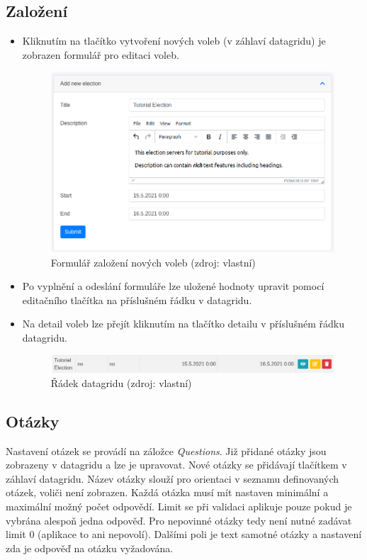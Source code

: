 \subsection*{Založení}
\begin{itemize}
	\item Kliknutím na tlačítko vytvoření nových voleb (v záhlaví datagridu) je zobrazen formulář pro editaci voleb.
	\begin{figure}[h]
	\centering
	\includegraphics[width=\linewidth]{tex/attachements/noveVolbyForm.png}
	\captionsetup{width=\linewidth}
	\caption[Formulář založení nových voleb]{Formulář založení nových voleb (zdroj: vlastní)}
\end{figure}
	\item Po vyplnění a odeslání formuláře lze uložené hodnoty upravit pomocí editačního tlačítka na příslušném řádku v datagridu.
	\item Na detail voleb lze přejít kliknutím na tlačítko detailu v příslušném řádku datagridu.
	\begin{figure}[h]
	\centering
	\includegraphics[width=\linewidth]{tex/attachements/noveVolbyGrid.png}
	\captionsetup{width=\linewidth}
	\caption*{Řádek datagridu (zdroj: vlastní)}
\end{figure}
\end{itemize}






\subsection*{Otázky}
Nastavení otázek se provádí na záložce \textit{Questions}. Již přidané otázky jsou zobrazeny v datagridu a lze je upravovat. Nové otázky se přidávají tlačítkem v záhlaví datagridu. Název otázky slouží pro orientaci v seznamu definovaných otázek, voliči není zobrazen. Každá otázka musí mít nastaven minimální a maximální možný počet odpovědí. Limit se při validaci aplikuje pouze pokud je vybrána alespoň jedna odpověď. Pro nepovinné otázky tedy není nutné zadávat limit 0 (aplikace to ani nepovolí). Dalšími poli je text samotné otázky a nastavení zda je odpověď na otázku vyžadována. 

